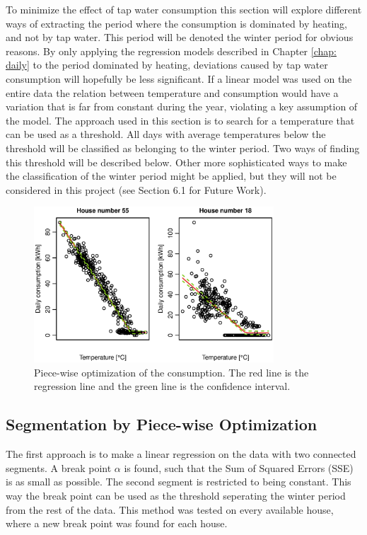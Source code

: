 \noindent To minimize the effect of tap water consumption this section will explore different ways of extracting the period where the consumption is dominated by heating, and not by tap water. This period will be denoted the winter period for obvious reasons. By only applying the regression models described in Chapter \ref{chap: daily} to the period dominated by heating, deviations caused by tap water consumption will hopefully be less significant. If a linear model was used on the entire data the relation between temperature and consumption would have a variation that is far from constant during the year, violating a key assumption of the model. The approach used in this section is to search for a temperature that can be used as a threshold. All days with average temperatures below the threshold will be classified as belonging to the winter period. Two ways of finding this threshold will be described below. Other more sophisticated ways to make the classification of the winter period might be applied, but they will not be considered in this project (see Section 6.1 for Future Work).
\begin{figure}
    \centering
    \includegraphics[width=0.8\textwidth]{../../../figures/Consumption_PW.eps}
    \caption{Piece-wise optimization of the consumption. The red line is the regression line and the green line is the confidence interval.}
    \label{fig: Consumption-PW}
\end{figure}

\subsection{Segmentation by Piece-wise Optimization}
The first approach is to make a linear regression on the data with two connected segments. A break point
$\alpha$ is found, such that the Sum of Squared Errors (SSE) is as small as possible. The second segment is restricted to
being constant. This way the break point can be used as the threshold seperating the winter period from the rest of the data. This method was tested on every available
house, where a new break point was found for each house.


